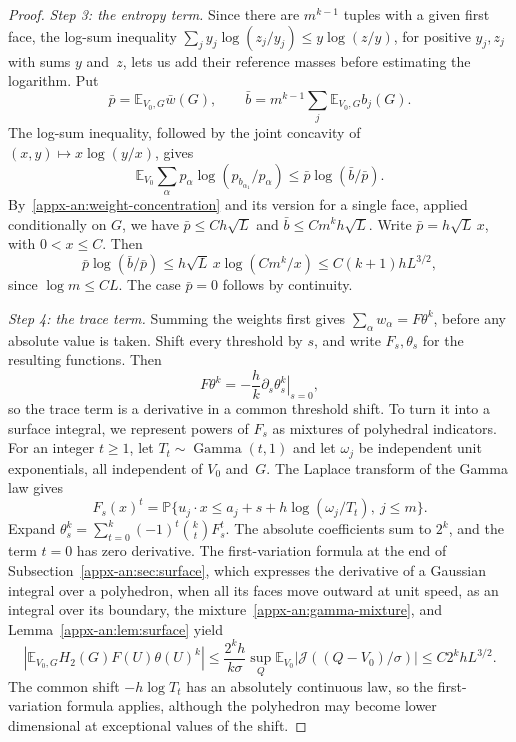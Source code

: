 \documentclass[11pt,letterpaper]{article}
\newif\ifshowrev
\newenvironment{revblock}{\ifshowrev\color{revblue}%
\hypersetup{linkcolor=revblue,citecolor=revblue,urlcolor=revblue}\fi}{}
\newif\ifshowpass
\newcommand{\ps}[1]{\ifshowpass{\color{revblue}#1}\else#1\fi}
\newif\ifshowtrim
\newcommand{\trim}[1]{\ifshowtrim{\color{revblue}%
\hypersetup{linkcolor=revblue,citecolor=revblue,urlcolor=revblue}#1}\else#1\fi}
\newif\ifshowskill
\newcommand{\sks}[1]{\ifshowskill{\color{revblue}#1}\else#1\fi}
\theoremstyle{remark}
\newcommand{\E}{\mathbb E}
\newcommand{\Pp}{\mathbb P}
\newcommand{\surf}{\mathcal J}
\begin{document}
\begin{revblock}
\begin{proof}
\emph{Step 3: the entropy term.} Since there are \(m^{k-1}\) tuples with
a given first face, the log-sum inequality
\(\sum_j\ps{y_j\log(z_j/y_j)\le y\log(z/y)}\), for positive
\(\ps{y_j,z_j}\) with sums \(\ps y\) and~\(\ps z\), lets us add their reference masses before
estimating the logarithm. Put
\[
 \bar p=\E_{V_0,G}\ps{\bar w}(G),\qquad
 \bar b=m^{k-1}\sum_j\E_{V_0,G}b_j(G).
\]
The log-sum inequality, followed by the joint concavity of
\((x,y)\mapsto x\log(y/x)\), gives
\[
 \E_{V_0}\sum_\alpha p_\alpha
          \log(p_{b_{\alpha_1}}/p_\alpha)
 \le\bar p\log(\bar b/\bar p).
\]
By~\eqref{appx-an:weight-concentration} and its version \trim{for a
single face}, applied
conditionally on \(G\), we have \(\bar p\le Ch\sqrt L\) and
\(\bar b\le Cm^kh\sqrt L\). Write \(\bar p=h\sqrt L\,x\), with
\(0<x\le C\). Then
\[
 \bar p\log(\bar b/\bar p)
 \le h\sqrt L\,x\log(Cm^k/x)
 \le C(k+1)hL^{3/2},
\]
since \(\log m\le CL\). The case \(\bar p=0\) follows by continuity.

\emph{Step 4: the \trim{trace term}.} Summing the weights first gives
\(\sum_\alpha w_\alpha=F\theta^k\)\trim{, before any absolute value is
taken}. Shift every threshold by \(s\), and write
\(F_s,\theta_s\) for the resulting functions. Then
\[
 F\theta^k=-\frac hk\left.\partial_s\theta_s^k\right|_{s=0},
\]
so the \trim{trace term} is a derivative in a common threshold shift. To turn
it into a surface integral, we represent powers of \(F_s\) as mixtures of
polyhedral indicators. For an integer \(\sks{t}\ge1\), let
\(T_{\sks{t}}\sim\operatorname{Gamma}(\sks{t},1)\) and let \(\omega_j\) be
independent unit exponentials, all independent of \(V_0\) and~\(G\). The
Laplace transform of the Gamma law gives
\begin{equation}
 F_s(x)^{\sks{t}}=
 \Pp\{u_j\cdot x\le a_j+s+h\log(\omega_j/T_{\sks{t}}),\ j\le m\}.
 \label{appx-an:gamma-mixture}
\end{equation}
Expand \(\theta_s^k=\sum_{\sks{t}=0}^k(-1)^{\sks{t}}\binom k{\sks{t}} F_s^{\sks{t}}\). The
absolute coefficients sum to \(2^k\), and the term \(\sks{t}=0\) has zero
derivative. The first-variation formula at the end of
Subsection~\ref{appx-an:sec:surface}, which expresses the derivative of a
Gaussian integral over a polyhedron, when all its faces move outward at
unit speed, as an integral over its boundary, the mixture~\eqref{appx-an:gamma-mixture},
and Lemma~\ref{appx-an:lem:surface} yield
\[
 \left|\E_{V_0,G}H_2(G)F(U)\theta(U)^k\right|
 \le\frac{2^kh}{k\sigma}
   \sup_Q\E_{V_0}|\surf((Q-V_0)/\sigma)|
 \le C2^khL^{3/2}.
\]
The common shift \(-h\log T_{\sks{t}}\) has an absolutely continuous law, so
the first-variation formula applies\trim{, although the polyhedron
may become lower dimensional at exceptional values of the shift}.


\end{proof}
\end{revblock}
\end{document}
